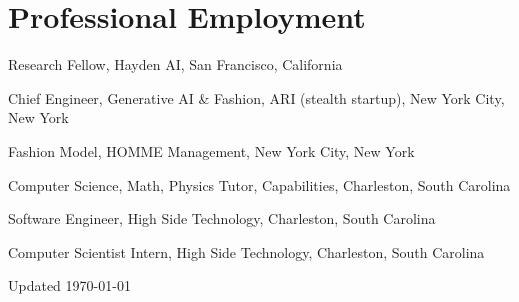 \documentclass[11pt,letterpaper]{report}
\begin{document}
    \section*{Professional Employment}

    \begin{tablist}

        \item[2024-] \tab{}Research Fellow, Hayden AI, San Francisco, California 
        \item[2023] \tab{}Chief Engineer, Generative AI \& Fashion, ARI (stealth startup), New York City, New York
        \item[2023] \tab{}Fashion Model, HOMME Management, New York City, New York
        \item[2022] \tab{}Computer Science, Math, Physics Tutor, Capabilities, Charleston, South Carolina 
        \item[2021-22] \tab{}Software Engineer, High Side Technology, Charleston, South Carolina 
        \item[2020-21] \tab{}Computer Scientist Intern, High Side Technology, Charleston, South Carolina 

    \end{tablist}



    \begin{center}
        \vfill
        Updated \monthyeardate\today
    \end{center}
\end{document}
